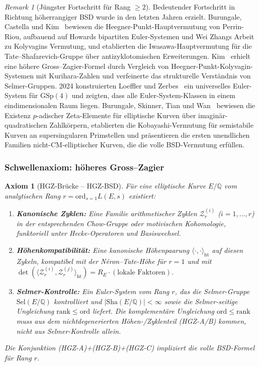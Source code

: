 \documentclass[aps,prd,twocolumn,superscriptaddress,nofootinbib,floatfix]{revtex4-2}
\newtheorem{axiom}[theorem]{Axiom}
\theoremstyle{definition}
\theoremstyle{remark}
\newtheorem{remark}[theorem]{Remark}
\begin{document}
\begin{remark}[Jüngster Fortschritt für Rang $\geq 2$]\label{rem:recent-bsd}
Bedeutender Fortschritt in Richtung höherrangiger BSD wurde in den letzten Jahren erzielt. Burungale, Castella und Kim~\cite{BurungaleCastellaKim2021} bewiesen die Heegner-Punkt-Hauptvermutung von Perrin-Riou, aufbauend auf Howards bipartiten Euler-Systemen und Wei Zhangs Arbeit zu Kolyvagins Vermutung, und etablierten die Iwasawa-Hauptvermutung für die Tate--Shafarevich-Gruppe über antizyklotomischen Erweiterungen. Kim~\cite{Kim2024} erhielt eine höhere Gross--Zagier-Formel durch Vergleich von Heegner-Punkt-Kolyvagin-Systemen mit Kurihara-Zahlen und verfeinerte das strukturelle Verständnis von Selmer-Gruppen. 2024 konstruierten Loeffler und Zerbes~\cite{LoefflerZerbes2024} ein universelles Euler-System für $\mathrm{GSp}(4)$ und zeigten, dass alle Euler-System-Klassen in einem eindimensionalen Raum liegen. Burungale, Skinner, Tian und Wan~\cite{BSTW2024} bewiesen die Existenz $p$-adischer Zeta-Elemente für elliptische Kurven über imaginär-quadratischen Zahlkörpern, etablierten die Kobayashi-Vermutung für semistabile Kurven an supersingularen Primstellen und präsentieren die ersten unendlichen Familien nicht-CM-elliptischer Kurven, die die volle BSD-Vermutung erfüllen.
\end{remark}

\subsubsection*{Schwellenaxiom: höheres Gross--Zagier}

\begin{axiom}[HGZ-Brücke -- HGZ-BSD]\label{ax:hgz-bsd}
Für eine elliptische Kurve $E/\mathbb{Q}$ vom analytischen Rang $r = \mathrm{ord}_{s=1} L(E,s)$ existiert:
\begin{enumerate}
\item[(HGZ-A)] \textbf{Kanonische Zyklen:} Eine Familie arithmetischer Zyklen $\mathcal{Z}_r^{(i)}$ ($i = 1, \ldots, r$) in der entsprechenden Chow-Gruppe oder motivischen Kohomologie, funktoriell unter Hecke-Operatoren und Basiswechsel.
\item[(HGZ-B)] \textbf{Höhenkompatibilität:} Eine kanonische Höhenpaarung $\langle \cdot, \cdot \rangle_{\mathrm{ht}}$ auf diesen Zykeln, kompatibel mit der Néron--Tate-Höhe für $r=1$ und mit $\det(\langle \mathcal{Z}_r^{(i)}, \mathcal{Z}_r^{(j)} \rangle_{\mathrm{ht}}) = R_E \cdot (\text{lokale Faktoren})$.
\item[(HGZ-C)] \textbf{Selmer-Kontrolle:} Ein Euler-System vom Rang $r$, das die Selmer-Gruppe $\mathrm{Sel}(E/\mathbb{Q})$ kontrolliert und $|\mathrm{Sha}(E/\mathbb{Q})| < \infty$ sowie die Selmer-seitige Ungleichung $\mathrm{rank} \leq \mathrm{ord}$ liefert. Die komplementäre Ungleichung $\mathrm{ord} \leq \mathrm{rank}$ muss aus dem nichtdegenerierten Höhen-/Zyklenteil (HGZ-A/B) kommen, nicht aus Selmer-Kontrolle allein.
\end{enumerate}
Die Konjunktion (HGZ-A)+(HGZ-B)+(HGZ-C) impliziert die volle BSD-Formel für Rang $r$.
\end{axiom}
\end{document}

